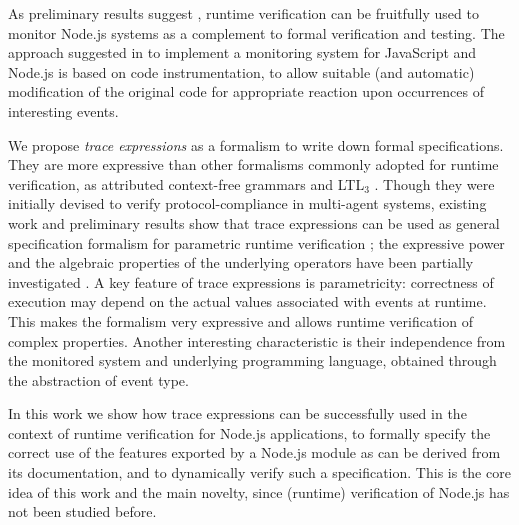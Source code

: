 As preliminary results suggest \cite{TowardsIoT17}, runtime verification can be fruitfully used to monitor Node.js systems as a complement to formal verification and testing.
The approach suggested in \cite{TowardsIoT17} to implement a monitoring system for JavaScript and Node.js is based on code instrumentation, to allow suitable (and automatic) modification of the original code for appropriate reaction upon occurrences of interesting events.

We propose \emph{trace expressions} \cite{ancona2016comparing} as a formalism to write down formal specifications.
They are more expressive than other formalisms commonly adopted for runtime verification, as
attributed context-free grammars \cite{de2014combining} and LTL$_3$ \cite{AnconaFM16}.
Though they were initially devised to verify protocol-compliance in multi-agent systems, existing work and preliminary results show that trace expressions can be used as general specification formalism for parametric runtime verification \cite{ParametricJava17, TowardsIoT17};
the expressive power and the algebraic properties of the underlying operators have been partially investigated \cite{ParametricJava17,ancona2016comparing}.
A key feature of trace expressions is parametricity: correctness of execution may depend on the actual values associated with events at runtime.
This makes the formalism very expressive and allows runtime verification of complex properties.
Another interesting characteristic is their independence from the monitored system and underlying programming language,
obtained through the abstraction of event type.

In this work we show how trace expressions can be successfully used in the context of runtime verification for
Node.js applications, to formally specify the correct use of the features exported by a Node.js module as
can be derived from its documentation, and to dynamically verify such a specification.
This is the core idea of this work and the main novelty, since (runtime) verification of Node.js has not been studied before.

